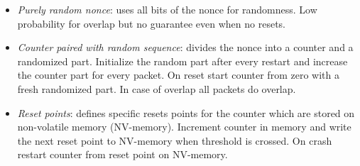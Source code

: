 \begin{itemize}
	\item \textit{Purely random nonce}: uses all bits of the nonce for randomness. Low
	      probability for overlap but no guarantee even when no resets.
	\item \textit{Counter paired with random sequence}: divides the nonce into a counter
	      and a randomized part. Initialize the random part after every restart and increase
	      the counter part for every packet. On reset start counter from zero with a fresh
	      randomized part. In case of overlap all packets do overlap.
	\item \textit{Reset points}: defines specific resets points for the counter which are
	      stored on non-volatile memory (NV-memory). Increment counter in memory and write the
	      next reset point to NV-memory when threshold is crossed. On crash restart counter from
	      reset point on NV-memory.
\end{itemize}






